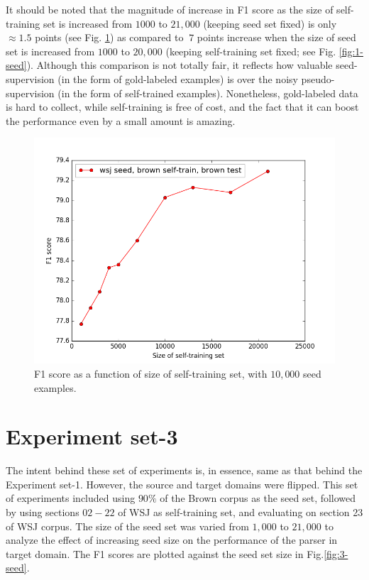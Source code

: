 \documentclass{sig-alternate-05-2015}
\begin{document}
It should be noted that the magnitude of increase in F1 score as the size of self-training set is increased from $1000$ to $21,000$ (keeping seed set fixed) is only $\approx1.5$ points (see Fig. \ref{fig:2-self}) as compared to $~7$ points increase when the size of seed set is increased from $1000$ to $20,000$ (keeping self-training set fixed; see Fig. \ref{fig:1-seed}). Although this comparison is not totally fair, it reflects how valuable seed-supervision (in the form of gold-labeled examples) is over the noisy pseudo-supervision (in the form of self-trained examples). Nonetheless, gold-labeled data is hard to collect, while self-training is free of cost, and the fact that it can boost the performance even by a small amount is amazing.

\begin{figure}
\centering
\includegraphics[width=0.95\columnwidth]{figs/fig-2-self}
\caption{F1 score as a function of size of self-training set, with $10,000$ seed examples.}
\label{fig:2-self}
\end{figure}

\section{Experiment set-3}
The intent behind these set of experiments is, in essence, same as that behind the Experiment set-1. However, the source and target domains were flipped. This set of experiments included using $90\%$ of the Brown corpus as the seed set, followed by using sections $02-22$ of WSJ as self-training set, and evaluating on section 23 of WSJ corpus. The size of the seed set was varied from $1,000$ to $21,000$ to analyze the effect of increasing seed size on the performance of the parser in target domain. The F1 scores are plotted against the seed set size in Fig.\ref{fig:3-seed}. 
\end{document}
